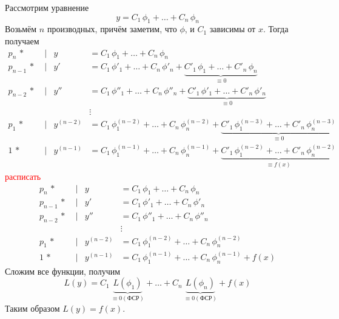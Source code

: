 \begin{Proof}
    Рассмотрим уравнение 
    \[
        y = C_1\,\phi_1 + \dots + C_n\,\phi_n
    \]
    Возьмём $n$ производных, причём заметим, что $\phi$, и $C_1$ зависимы от $x$. Тогда получаем
    \begin{align*}
        p_n\,* \; &| &y &= C_1\,\phi_1 + \dots + C_n\,\phi_n\\
        p_{n-1}\,*\; &| &y' &= C_1\,\phi'_1 + \dots + C_n\,\phi'_n +  \underbrace{C'_1\,\phi_1 + \dots + C'_n\,\phi_n}_{\equiv 0}\\
        p_{n-2}\,*\; &| & y'' &= C_1\,\phi''_1 + \dots + C_n\,\phi''_n + \underbrace{C'_1\,\phi'_1 + \dots + C'_n\,\phi'_n}_{\equiv 0}\\
        & & &\vdots\\
        p_1\,*\; &| &y^{(n-2)} &= C_1\,\phi_1^{(n-2)} + \dots + C_n\,\phi_n^{(n-2)} + \underbrace{C'_1\,\phi^{(n-3)}_1 + \dots + C'_n\,\phi^{(n-3)}_n}_{\equiv 0}\\
        1\,*\; &| &y^{(n-1)} &= C_1\,\phi_1^{(n-1)} + \dots + C_n\,\phi_n^{(n-1)} + \underbrace{C'_1\,\phi^{(n-2)}_1 + \dots + C'_n\,\phi^{(n-2)}_n}_{\equiv f(x)}
    \end{align*}
    \textcolor{red}{расписать}
    \begin{align*}
        p_n\,* \; &| &y &= C_1\,\phi_1 + \dots + C_n\,\phi_n\\
        p_{n-1}\,*\; &| &y' &= C_1\,\phi'_1 + \dots + C_n\,\phi'_n\\
        p_{n-2}\,*\; &| & y'' &= C_1\,\phi''_1 + \dots + C_n\,\phi''_n\\
        & & &\vdots\\
        p_1\,*\; &| &y^{(n-2)} &= C_1\,\phi_1^{(n-2)} + \dots + C_n\,\phi_n^{(n-2)}\\
        1\,*\; &| &y^{(n-1)} &= C_1\,\phi_1^{(n-1)} + \dots + C_n\,\phi_n^{(n-1)} +  f(x)
    \end{align*}
    Сложим все функции, получим
    \[
        L(y) = C_1\,\underbrace{L(\phi_1)}_{\equiv 0 (\text{ФСР})} + \dots + C_n\,\underbrace{L(\phi_n)}_{\equiv 0 (\text{ФСР})} + f(x) 
    \]
    Таким образом $L(y) = f(x)$.
    

\end{Proof}
